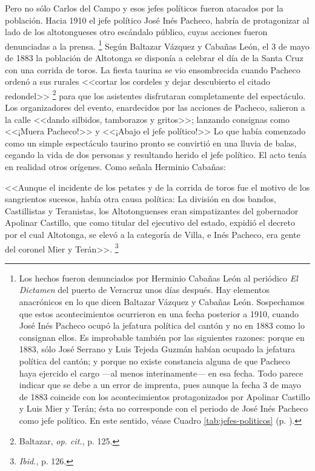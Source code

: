 \documentclass[14pt,twoside,final]{extbook} %
\let\oldfootnote\footnote
\renewcommand\footnote[1]{%
\oldfootnote{\hspace{1mm}#1}}
\begin{document}
Pero no sólo Carlos del Campo y esos jefes políticos fueron atacados por la población. Hacia 1910 el jefe político José Inés Pacheco, habría de protagonizar al lado de los altotongueses otro escándalo público, cuyas acciones fueron denunciadas a la prensa.\footnote{Los hechos fueron denunciados por Herminio Cabañas León al periódico \emph{El Dictamen} del puerto de Veracruz unos días después. Hay elementos anacrónicos en lo que dicen Baltazar Vázquez y Cabañas León. Sospechamos que estos acontecimientos ocurrieron en una fecha posterior a 1910, cuando José Inés Pacheco ocupó la jefatura política del cantón y no en 1883 como lo consignan ellos. Es improbable también por las siguientes razones: porque en 1883, sólo José Serrano y Luis Tejeda Guzmán habían ocupado la jefatura política del cantón; y porque no existe constancia alguna de que Pacheco haya ejercido el cargo ---al menos interinamente--- en esa fecha. Todo parece indicar que se debe a un error de imprenta, pues aunque la fecha 3 de mayo de 1883 coincide con los acontecimientos protagonizados por Apolinar Castillo y Luis Mier y Terán; ésta no corresponde con el periodo de José Inés Pacheco como jefe político. En este sentido, véase Cuadro \ref{tab:jefes-politicos} (p. \pageref{tab:jefes-politicos}).} Según Baltazar Vázquez y Cabañas León, el 3 de mayo de 1883 la población de Altotonga se disponía a celebrar el día de la Santa Cruz con una corrida de toros. La fiesta taurina se vio ensombrecida cuando Pacheco ordenó a sus rurales <<cortar los cordeles y dejar descubierto el citado redondel>>\footnote{Baltazar, \emph{op. cit.}, p. 125.} para que los asistentes disfrutaran completamente del espectáculo. Los organizadores del evento, enardecidos por las acciones de Pacheco, salieron a la calle <<dando silbidos, tamborazos y gritos>>; lanzando consignas como <<¡Muera Pacheco!>> y <<¡Abajo el jefe político!>> Lo que había comenzado como un simple espectáculo taurino pronto se convirtió en una lluvia de balas, cegando la vida de dos personas y resultando herido el jefe político. El acto tenía en realidad otros orígenes. Como señala Herminio Cabañas:
\begin{quoting}
<<Aunque el incidente de los petates y de la corrida de toros fue el motivo de los sangrientos sucesos, había otra causa política: La división en dos bandos, Castillistas y Teranistas, los Altotonguenses eran simpatizantes del gobernador Apolinar Castillo, que como titular del ejecutivo del estado, expidió el decreto por el cual Altotonga, se elevó a la categoría de Villa, e Inés Pacheco, era gente del coronel Mier y Terán>>.\footnote{\emph{Ibid.}, p. 126.}
\end{quoting}
\end{document}
